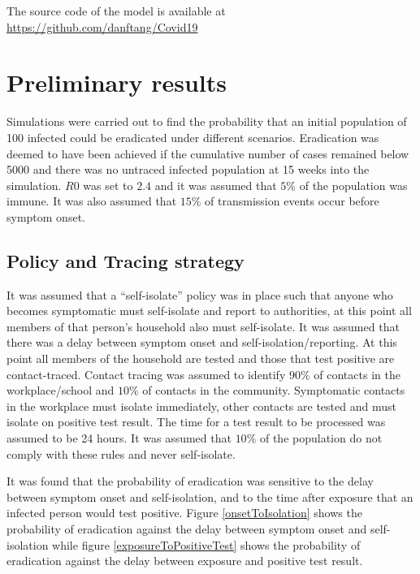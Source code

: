 \documentclass{article}
\begin{document}
The source code of the model is available at \href{https://github.com/danftang/Covid19}{https://github.com/danftang/Covid19}

\section{Preliminary results}

Simulations were carried out to find the probability that an initial population of 100 infected could be eradicated under different scenarios. Eradication was deemed to have been achieved if the cumulative number of cases remained below 5000 and there was no untraced infected population at 15 weeks into the simulation. $R0$ was set to $2.4$ and it was assumed that $5\%$ of the population was immune. It was also assumed that $15\%$ of transmission events occur before symptom onset.

\subsection{Policy and Tracing strategy}

It was assumed that a ``self-isolate'' policy was in place such that anyone who becomes symptomatic must self-isolate and report to authorities, at this point all members of that person's household also must self-isolate. It was assumed that there was a delay between symptom onset and self-isolation/reporting. At this point all members of the household are tested and those that test positive are contact-traced. Contact tracing was assumed to identify $90\%$ of contacts in the workplace/school and $10\%$ of contacts in the community. Symptomatic contacts in the workplace must isolate immediately, other contacts are tested and must isolate on positive test result. The time for a test result to be processed was assumed to be 24 hours. It was assumed that $10\%$ of the population do not comply with these rules and never self-isolate.

It was found that the probability of eradication was sensitive to the delay between symptom onset and self-isolation, and to the time after exposure that an infected person would test positive. Figure \ref{onsetToIsolation} shows the probability of eradication against the delay between symptom onset and self-isolation while figure \ref{exposureToPositiveTest} shows the probability of eradication against the delay between exposure and positive test result.
\end{document}
